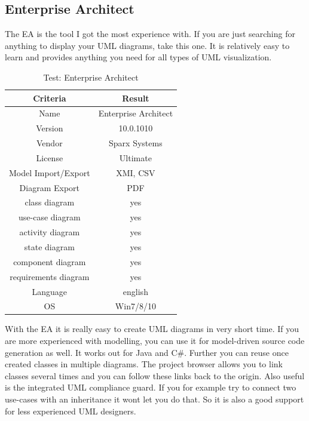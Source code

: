 \subsection{Enterprise Architect}
The EA is the tool I got the most experience with. If you are just searching for anything to display your UML diagrams, take this one. It is relatively easy to learn and provides anything you need for all types of UML visualization. 
\begin{table}[htbp]
\centering
\begin{tabular}{c|c}
\hline \hline 
Criteria & Result \\ \hline \hline
Name & Enterprise Architect \\ \hline
Version & 10.0.1010 \\ \hline
Vendor & Sparx Systems \\ \hline
License & Ultimate \\ \hline
Model Import/Export & XMI, CSV \\ \hline
Diagram Export & PDF \\ \hline
class diagram & yes \\ \hline
use-case diagram & yes \\ \hline
activity diagram & yes \\ \hline
state diagram & yes \\ \hline
component diagram & yes \\ \hline
requirements diagram & yes \\ \hline
Language & english \\ \hline
OS & Win7/8/10 \\ \hline \hline
\end{tabular}
\caption{Test: Enterprise Architect}
\label{tab:ea}
\end{table}
With the EA it is really easy to create UML diagrams in very short time. If you are more experienced with modelling, you can use it for model-driven source code generation as well. It works out for Java and C\#. Further you can reuse once created classes in multiple diagrams. The project browser allows you to link classes several times and you can follow these links back to the origin. Also useful is the integrated UML compliance guard. If you for example try to connect two use-cases with an inheritance it wont let you do that. So it is also a good support for less experienced UML designers.
\pagebreak
